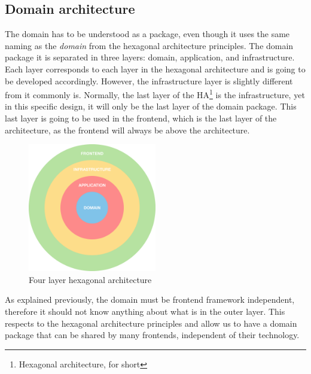 \documentclass[../design.tex]{subfiles}
\begin{document}
\subsection{Domain architecture}
The domain has to be understood as a package, even though it uses the same
naming as the \emph{domain} from the hexagonal architecture principles. The
domain package it is separated in three layers: domain, application, and
infrastructure. Each layer corresponds to each layer in the hexagonal
architecture and is going to be developed accordingly. However, the
infrastructure layer is slightly different from it commonly is. Normally, the
last layer of the HA\footnote{Hexagonal architecture, for short} is the
infrastructure, yet in this specific design, it will only be the last layer of
the domain package. This last layer is going to be used in the frontend, which
is the last layer of the architecture, as the frontend will always be above the
architecture.
\begin{figure}[H]
	\centering
	\includegraphics[width=0.5\textwidth]{./assets/ha.png}
	\caption{Four layer hexagonal architecture}
\end{figure}
As explained previously, the domain must be frontend framework independent,
therefore it should not know anything about what is in the outer layer. This
respects to the hexagonal architecture principles and allow us to have a domain
package that can be shared by many frontends, independent of their technology.
\end{document}
